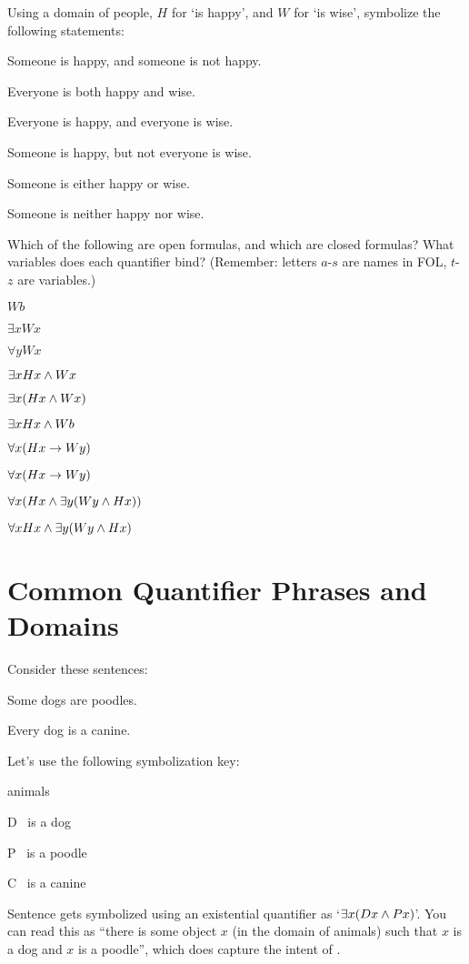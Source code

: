 \practiceproblems

\problempart Using a domain of people, $H$ for `\blank is happy', and $W$ for `\blank is wise', symbolize the following statements:

\begin{earg}
\item Someone is happy, and someone is not happy.
\item Everyone is both happy and wise.
\item Everyone is happy, and everyone is wise.
\item Someone is happy, but not everyone is wise.
\item Someone is either happy or wise.
\item Someone is neither happy nor wise.
\end{earg}



\problempart Which of the following are open formulas, and which are closed formulas?  What variables does each quantifier bind? (Remember: letters $a$-$s$ are names in FOL, $t$-$z$ are variables.)

\begin{earg}
\item $Wb$
\item $\exists x Wx$
\item $\forall yWx$
\item $\exists xHx \wedge  Wx$
\item $\exists x(Hx \wedge  Wx)$
\item $\exists x Hx \wedge  Wb$
\item $\forall x(Hx \rightarrow Wy)$
\item $\forall x(Hx \rightarrow Wy)$
\item $\forall x(Hx \wedge \exists y(Wy \wedge Hx))$
\item $\forall xHx \wedge \exists y(Wy \wedge Hx)$
\end{earg}


\section{Common Quantifier Phrases and Domains}\label{s:QuantifierPhrases}
Consider these sentences:
	\begin{earg}
		\item[\ex{quan2}] Some dogs are poodles.
		\item[\ex{quan1}] Every dog is a canine.
	\end{earg}
Let's use the following symbolization key:
	\begin{ekey}
		\item[\text{Domain}] animals
		\item[D] \blank\ is a dog
		\item[P] \blank\ is  a poodle
		\item[C] \blank\ is a canine
	\end{ekey}
Sentence  gets symbolized using an existential quantifier as `$\exists x(Dx \wedge Px)$'.  You can read this as ``there is some object $x$ (in the domain of animals) such that $x$ is a dog and $x$ is a poodle'', which does capture the intent of .

